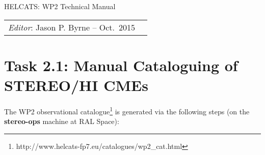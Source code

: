 \documentclass[12pt, a4paper, oneside]{article}
\begin{document}








\begin{center}
{\sc \Large HELCATS: WP2 Technical Manual}
\end{center}

 
\begin{center}
\begin{tabular}{ll}
\textit{Editor}: Jason P. Byrne -- Oct.~2015
\end{tabular}
\end{center}
 

\section*{\sc Task 2.1: Manual Cataloguing of STEREO/HI CMEs}

The WP2 observational catalogue\footnote{http://www.helcats-fp7.eu/catalogues/wp2\_cat.html} is generated via the following steps (on the {\bf stereo-ops} machine at RAL Space):
\end{document}
